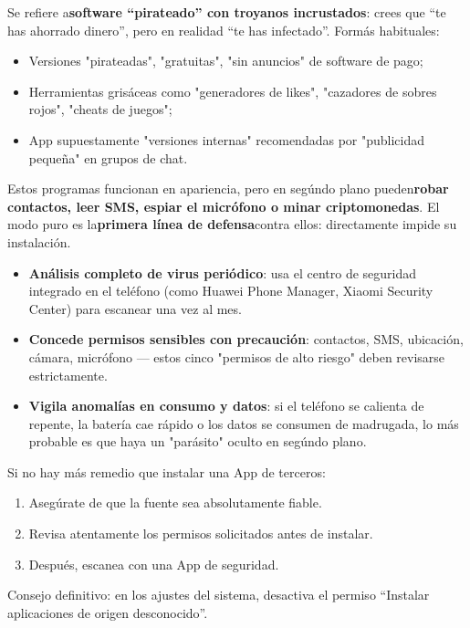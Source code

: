 Se refiere a\textbf{software “pirateado” con troyanos incrustados}: crees que “te has ahorrado dinero”, pero en realidad “te has infectado”. Formás habituales:

\begin{itemize}
  \item Versiones "pirateadas", "gratuitas", "sin anuncios" de software de pago;
  \item Herramientas grisáceas como "generadores de likes", "cazadores de sobres rojos", "cheats de juegos";
  \item App supuestamente "versiones internas" recomendadas por "publicidad pequeña" en grupos de chat.
\end{itemize}

Estos programas funcionan en apariencia, pero en segúndo plano pueden\textbf{robar contactos, leer SMS, espiar el micrófono o minar criptomonedas}. El modo puro es la\textbf{primera línea de defensa}contra ellos: directamente impide su instalación.


\begin{itemize}
  \item \textbf{Análisis completo de virus periódico}: usa el centro de seguridad integrado en el teléfono (como Huawei Phone Manager, Xiaomi Security Center) para escanear una vez al mes.
  \item \textbf{Concede permisos sensibles con precaución}: contactos, SMS, ubicación, cámara, micrófono — estos cinco "permisos de alto riesgo" deben revisarse estrictamente.
  \item \textbf{Vigila anomalías en consumo y datos}: si el teléfono se calienta de repente, la batería cae rápido o los datos se consumen de madrugada, lo más probable es que haya un "parásito" oculto en segúndo plano.
\end{itemize}

Si no hay más remedio que instalar una App de terceros:

\begin{enumerate}
  \item Asegúrate de que la fuente sea absolutamente fiable.
  \item Revisa atentamente los permisos solicitados antes de instalar.
  \item Después, escanea con una App de seguridad.
\end{enumerate}

Consejo definitivo: en los ajustes del sistema, desactiva el permiso “Instalar aplicaciones de origen desconocido”.

